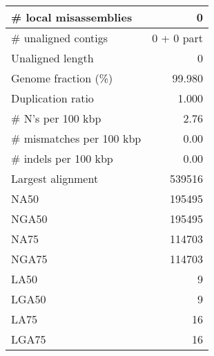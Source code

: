 \documentclass[12pt,a4paper]{article}
\begin{document}
\begin{table}[ht]
\begin{center}
\begin{tabular}{|l*{1}{|r}|}
\# local misassemblies & 0 \\ \hline
\# unaligned contigs & 0 + 0 part \\ \hline
Unaligned length & 0 \\ \hline
Genome fraction (\%) & 99.980 \\ \hline
Duplication ratio & 1.000 \\ \hline
\# N's per 100 kbp & 2.76 \\ \hline
\# mismatches per 100 kbp & 0.00 \\ \hline
\# indels per 100 kbp & 0.00 \\ \hline
Largest alignment & 539516 \\ \hline
NA50 & 195495 \\ \hline
NGA50 & 195495 \\ \hline
NA75 & 114703 \\ \hline
NGA75 & 114703 \\ \hline
LA50 & 9 \\ \hline
LGA50 & 9 \\ \hline
LA75 & 16 \\ \hline
LGA75 & 16 \\ \hline
\end{tabular}
\end{center}
\end{table}
\end{document}
